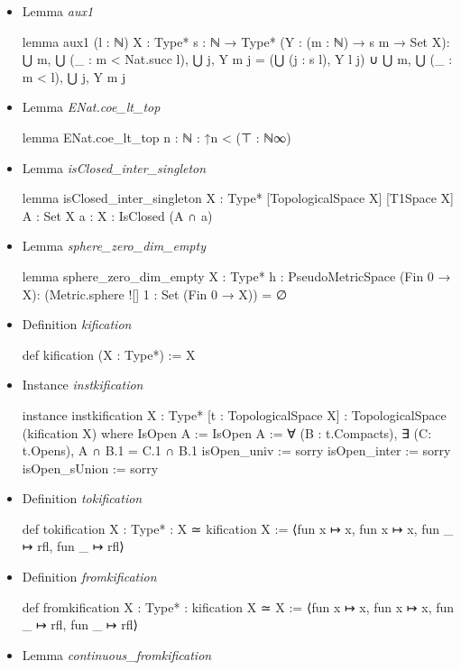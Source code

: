 \documentclass[colorinlistoftodos]{article}
\begin{document}
\begin{itemize}
  \item Lemma \emph{aux1}
\begin{leancode}
lemma aux1 (l : ℕ) {X : Type*} {s : ℕ →  Type*} (Y : (m : ℕ) → s m → Set X):
    ⋃ m, ⋃ (_ : m < Nat.succ l), ⋃ j, Y m j =
    (⋃ (j : s l), Y l j) ∪ ⋃ m, ⋃ (_ : m < l), ⋃ j, Y m j
\end{leancode}
  \item Lemma \emph{ENat.coe\_lt\_top}
\begin{leancode}
lemma ENat.coe_lt_top {n : ℕ} : ↑n < (⊤ : ℕ∞)
\end{leancode}
  \item Lemma \emph{isClosed\_inter\_singleton}
\begin{leancode}
lemma isClosed_inter_singleton {X : Type*} [TopologicalSpace X] [T1Space X] {A : Set X}
{a : X} : IsClosed (A ∩ {a})
\end{leancode}
  \item Lemma \emph{sphere\_zero\_dim\_empty}
\begin{leancode}
lemma sphere_zero_dim_empty {X : Type*} {h : PseudoMetricSpace (Fin 0 → X)}:
  (Metric.sphere ![] 1 : Set (Fin 0 → X)) = ∅
\end{leancode}
  \item Definition \emph{kification}
\begin{leancode}
def kification (X : Type*) := X
\end{leancode}
  \item Instance \emph{instkification}
\begin{leancode}
instance instkification {X : Type*} [t : TopologicalSpace X] :
TopologicalSpace (kification X) where
  IsOpen A := IsOpen A := ∀ (B : t.Compacts), ∃ (C: t.Opens), A ∩ B.1 = C.1 ∩ B.1
  isOpen_univ := sorry
  isOpen_inter := sorry
  isOpen_sUnion := sorry
\end{leancode}
  \item Definition \emph{tokification}
\begin{leancode}
def tokification {X : Type*} : X ≃ kification X :=
⟨fun x ↦ x, fun x ↦ x, fun _ ↦ rfl, fun _ ↦ rfl⟩
\end{leancode}
  \item Definition \emph{fromkification}
\begin{leancode}
def fromkification {X : Type*} : kification X ≃ X :=
⟨fun x ↦ x, fun x ↦ x, fun _ ↦ rfl, fun _ ↦ rfl⟩
\end{leancode}
  \item Lemma \emph{continuous\_fromkification}

\end{itemize}
\end{document}
